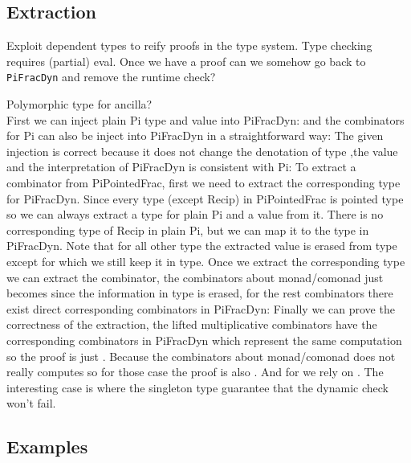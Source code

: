 \documentclass[sigplan,10pt,review,anonymous]{acmart}
\begin{document}
{\center}

\subsection{Extraction}

Exploit dependent types to reify proofs in the type system. Type
checking requires (partial) eval. Once we have a proof can we somehow
go back to \verb|PiFracDyn| and remove the runtime check?

Polymorphic type for ancilla?
\\
First we can inject plain Pi type and value into PiFracDyn:
\INJU{}
and the combinators for Pi can also be inject into PiFracDyn in a straightforward way:
\INJcomb{}
The given injection is correct because it does not change the denotation of type
\INJUeq{}
,the value
\INJVeq{}
and the interpretation of PiFracDyn is consistent with Pi:
\INJEvaleq{}
To extract a combinator from PiPointedFrac, first we need to extract the corresponding type for PiFracDyn.
Since every type (except Recip) in PiPointedFrac is pointed type so we can always extract a type for plain
Pi and a value from it.
There is no corresponding type of Recip in plain Pi, but we can map it to the
\AgdaSpace{} type in PiFracDyn.
Note that for all other type the extracted value is erased from type except for
\AgdaSpace{}
which we still keep it in type.
\EXTU{}
Once we extract the corresponding type we can extract the combinator, the combinators about monad/comonad
just becomes  since the information in type is erased,
for the rest combinators there exist direct corresponding combinators in PiFracDyn:
\EXTUComb{}
Finally we can prove the correctness of the extraction,
the lifted multiplicative combinators have the corresponding combinators in PiFracDyn which represent
the same computation so the proof is just .
Because the combinators about monad/comonad does not really
computes so for those case the proof is also .
And for  we rely on .
The interesting case is  where the singleton type guarantee that
the dynamic check won't fail.
\EXTeq{}

\subsection{Examples}
\label{sec:cat}
\end{document}
